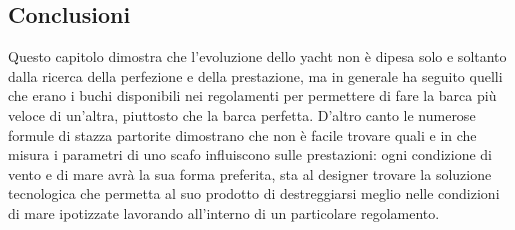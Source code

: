 			\subsection{Conclusioni}
				Questo capitolo dimostra che l'evoluzione dello yacht non è dipesa solo e soltanto dalla ricerca della perfezione e della prestazione, ma in generale ha seguito quelli che erano i buchi disponibili nei regolamenti per permettere di fare la barca più veloce di un'altra, piuttosto che la barca perfetta. D'altro canto le numerose formule di stazza partorite dimostrano che non è facile trovare quali e in che misura i parametri di uno scafo influiscono sulle prestazioni: ogni condizione di vento e di mare avrà la sua forma preferita, sta al designer trovare la soluzione tecnologica che permetta al suo prodotto di destreggiarsi meglio nelle condizioni di mare ipotizzate lavorando all'interno di un particolare regolamento.
			
			